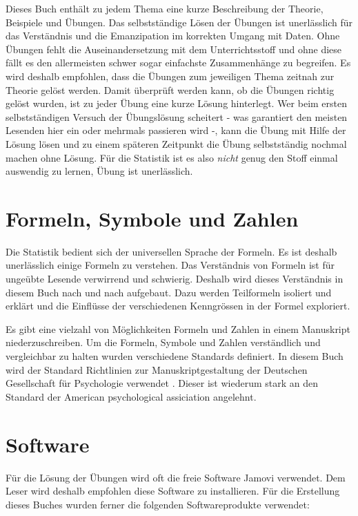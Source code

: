 \documentclass[
]{book}
\theoremstyle{definition}
\theoremstyle{definition}
\theoremstyle{definition}
\theoremstyle{definition}
\theoremstyle{remark}
\begin{document}
Dieses Buch enthält zu jedem Thema eine kurze Beschreibung der Theorie, Beispiele und Übungen. Das selbstständige Lösen der Übungen ist unerlässlich für das Verständnis und die Emanzipation im korrekten Umgang mit Daten. Ohne Übungen fehlt die Auseinandersetzung mit dem Unterrichtsstoff und ohne diese fällt es den allermeisten schwer sogar einfachste Zusammenhänge zu begreifen. Es wird deshalb empfohlen, dass die Übungen zum jeweiligen Thema zeitnah zur Theorie gelöst werden. Damit überprüft werden kann, ob die Übungen richtig gelöst wurden, ist zu jeder Übung eine kurze Lösung hinterlegt. Wer beim ersten selbstständigen Versuch der Übungslösung scheitert - was garantiert den meisten Lesenden hier ein oder mehrmals passieren wird -, kann die Übung mit Hilfe der Lösung lösen und zu einem späteren Zeitpunkt die Übung selbstständig nochmal machen ohne Lösung. Für die Statistik ist es also \emph{nicht} genug den Stoff einmal auswendig zu lernen, Übung ist unerlässlich.

\section{Formeln, Symbole und Zahlen}\label{formeln}

Die Statistik bedient sich der universellen Sprache der Formeln. Es ist deshalb unerlässlich einige Formeln zu verstehen. Das Verständnis von Formeln ist für ungeübte Lesende verwirrend und schwierig. Deshalb wird dieses Verständnis in diesem Buch nach und nach aufgebaut. Dazu werden Teilformeln isoliert und erklärt und die Einflüsse der verschiedenen Kenngrössen in der Formel exploriert.

Es gibt eine vielzahl von Möglichkeiten Formeln und Zahlen in einem Manuskript niederzuschreiben. Um die Formeln, Symbole und Zahlen verständlich und vergleichbar zu halten wurden verschiedene Standards definiert. In diesem Buch wird der Standard Richtlinien zur Manuskriptgestaltung der Deutschen Gesellschaft für Psychologie verwendet \citep{dgp2019}. Dieser ist wiederum stark an den Standard der American psychological assiciation angelehnt.

\section{Software}\label{software}

Für die Lösung der Übungen wird oft die freie Software Jamovi verwendet. Dem Leser wird deshalb empfohlen diese Software zu installieren. Für die Erstellung dieses Buches wurden ferner die folgenden Softwareprodukte verwendet:
\end{document}
